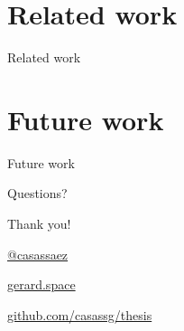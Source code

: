 \documentclass{beamer}
\newcommand{\hugeframedouble}[2]{
\begin{frame}[c]
  \begin{center}
    \huge\textcolor{title}{#1}
    \vfill

    \normalsize #2

  \end{center}

\end{frame}
}
\newcommand{\hugeframe}[1]{
\begin{frame}[c]
  \begin{center}
    \huge\textcolor{title}{#1}
  \end{center}

\end{frame}
}
\begin{document}
\section{Related work}
\hugeframe{Related work}

\section{Future work}
\hugeframe{Future work}

\hugeframe{Questions?}


\hugeframedouble{Thank you!}{
\begin{description}
  \addtolength{\itemsep}{5pt}
  \item[\textbf{Twitter}]  \href{http://twitter.com/casassaez}{@casassaez}
  \item[\textbf{Website}]  \href{http://gerard.space}{gerard.space}
  \item[\textbf{Repo}] \href{http://github.com/casassg/thesis}{github.com/casassg/thesis}

\end{description} 

}



\end{document}

